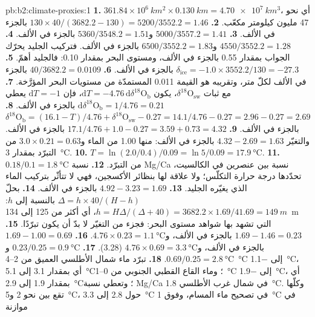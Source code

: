 \begin{solution}{pb:b2:climate-proxies:1}
\textbf{1.} $361.84 \times 10^6\ \unit{km^2} \times \qty{0.130}{km} = \qty{4.70e7}{km^3}$، أي نحو 47
مليون كيلومتر مكعّب.
\textbf{2.} $130 \times 40/(3682.2 - 130) = 5200/3552.2 = 1.46$ بالجزء في الألف.
\textbf{3.} $5000/3557.2 = 1.41$ و$5360/3548.2 = 1.51$ بالجزء في الألف.
\textbf{4.} $4550/3552.2 = 1.28$ و$6500/3552.2 = 1.83$ بالجزء في الألف. فتركيب الجليد
يحرّك الجواب بمقدار \num{0.55} بالجزء في الألف، ومستوى البحر بمقدار \num{0.10}: فالجليد أهمّ.
\textbf{5.} $\delta_{\mathrm{ice}} = -1.0 \times 3552.2/130 = -27.3$ بالجزء في الألف.
\textbf{6.} $40/3682.2 = 0.0109$ بالجزء في الألف لكلّ متر، وتقريبه هو القيمة \num{0.011} المستمدّة من
مستويات البحر المؤرَّخة.
\textbf{7.} مع ثبات $\delta^{18}\mathrm{O}_{\mathrm{sw}}$، يكون $\mathrm{d}T = -4.76\,\mathrm{d}\delta^{18}
\mathrm{O}_{\mathrm{b}}$، فإن $\mathrm{d}T = -1$ يعطي $\mathrm{d}\delta^{18}\mathrm{O}_{\mathrm{b}} =
1/4.76 = 0.21$ بالجزء في الألف.
\textbf{8.} $\delta^{18}\mathrm{O}_{\mathrm{b}} = (16.1 - T)/4.76 + \delta^{18}\mathrm{O}_{\mathrm{sw}}
- 0.27 = 14.1/4.76 - 0.27 = 2.96 - 0.27 = 2.69$ بالجزء في الألف.
\textbf{9.} $17.1/4.76 + 1.0 - 0.27 = 3.59 + 0.73 = 4.32$ بالجزء في الألف. والتغيّر $4.32 - 2.69 =
1.63$ بالجزء في الألف: منها \num{1.00} من الماء و$3.0 \times 0.21 = 0.63$ من التبرّد بمقدار
\qty{3}{\celsius}.
\textbf{10.} $T = \ln(2.0/0.4)/0.09 = \ln 5/0.09 = \qty{17.9}{\celsius}$.
\textbf{11.} $0.18/0.1 = \qty{1.8}{\celsius}$ من التبرّد.
\textbf{12.} نسبة Mg/Ca نسبة بين عنصرين في الكالسيت، تحدّدها درجة حرارة
التكلّس؛ ولا علاقة لها بنظائر الأكسجين، فهي لا تتأثّر بتركيب
الماء الذي يغيّره الجليد.
\textbf{13.} $4.92 - 3.23 = 1.69$ بالجزء في الألف.
\textbf{14.} بحلّ $\Delta = h \times 40/(H - h)$ بالنسبة إلى $h$: $h = H\Delta/(\Delta + 40) = 3682.2
\times 1.69/41.69 = \qty{149}{m}$، أي أكثر من 125 إلى \qty{134}{m} التي تشهد بها شواهد مستوى البحر:
فجزء من التغيّر لا بدّ أن يكون تبرّدًا.
\textbf{15.} $1.69 - 1.46 = 0.23$ بالجزء في الألف، و$4.76 \times 0.23 = \qty{1.1}{\celsius}$.
\textbf{16.} $1.69 - 1.00 = 0.69$ بالجزء في الألف، و$4.76 \times 0.69 = \qty{3.3}{\celsius}$ (3.28).
\textbf{17.} $0.23/0.25 = \qty{0.9}{\celsius}$ و$0.69/0.25 = \qty{2.8}{\celsius}$.
\textbf{18.} تبرّد ماء شمال الأطلسي العميق من 2--\qty{4}{\celsius} إلى \qty{-1.1}{\celsius}،
أي بمقدار 3.1 إلى \qty{5.1}{\celsius}؛ وماء القاع القطبي الجنوبي من 0--\qty{1}{\celsius} إلى
\qty{-1.9}{\celsius}، أي بمقدار 1.9 إلى \qty{2.9}{\celsius}؛ وتعطي نسبة Mg/Ca في شمال غرب الأطلسي
\qty{1.8}{\celsius}. وكلّها تقع بين نحو 2 و\qty{5}{\celsius}، حول 2.8 إلى
\qty{3.3}{\celsius} في تصحيح ماء المسام، وفوق \qty{1}{\celsius} في موازنة

\end{solution}
